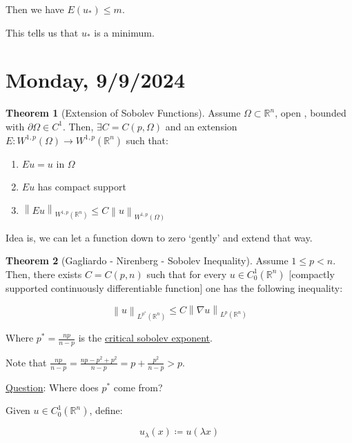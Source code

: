\documentclass{article}
\theoremstyle{definition}
\newtheorem{theorem}{Theorem}
\begin{document}
Then we have \(E(u_\ast) \leq m\).

This tells us that \(u_\ast\) is a minimum.


\section*{Monday, 9/9/2024}

\begin{theorem}
    [Extension of Sobolev Functions]

    Assume \(\Omega \subset \mathbb{R} ^n\), open , bounded with \(\partial \Omega \in C^1\). Then, \(\exists C = C(p, \Omega)\) and an extension \(E: W^{1,p}(\Omega) \to W^{1,p}(\mathbb{R}^n)\) such that:

    \begin{enumerate}[label=\roman*)]
        \item \(E u = u\) in \(\Omega\)
        \item \(E u\) has compact support
        \item \(\left\lVert E u \right\rVert _{W^{1,p}(\mathbb{R}^n)} \leq C \left\lVert u \right\rVert _{W^{1,p}(\Omega)}\)  
    \end{enumerate} 

\end{theorem}

Idea is, we can let a function down to zero `gently' and extend that way.

\begin{theorem}
    [Gagliardo - Nirenberg - Sobolev Inequality]

    Assume \(1 \leq p < n\). Then, there exists \(C = C(p, n)\) such that for every \(u\in C_0^1(\mathbb{R}^n)\) [compactly supported continuously differentiable function] one has the following inequality:

    \[
        \left\lVert u \right\rVert _{L^{p ^{\ast} }(\mathbb{R}^n)} \leq C \left\lVert \nabla u \right\rVert _{L^p(\mathbb{R}^n)}
    \]

    Where \(p ^{\ast} = \frac{np}{n-p}\) is the \underline{critical sobolev exponent}.

    Note that \(\frac{np}{n-p} = \frac{np-p^2 + p^2}{n-p} = p + \frac{p^2}{n-p} > p\). 
\end{theorem}

\underline{Question}: Where does \(p^{\ast}\) come from?

Given \(u\in C^1_0(\mathbb{R}^n)\), define:

\[
    u_\lambda (x) \coloneqq u(\lambda x)
\]
\end{document}
